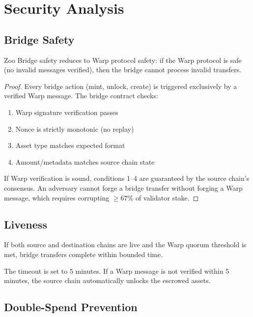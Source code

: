\section{Security Analysis}

\label{sec:security}

\subsection{Bridge Safety}

\begin{theorem}
Zoo Bridge safety reduces to Warp protocol safety: if the Warp protocol is safe (no invalid messages verified), then the bridge cannot process invalid transfers.
\end{theorem}

\begin{proof}
Every bridge action (mint, unlock, create) is triggered exclusively by a verified Warp message. The bridge contract checks:
\begin{enumerate}
    \item Warp signature verification passes
    \item Nonce is strictly monotonic (no replay)
    \item Asset type matches expected format
    \item Amount/metadata matches source chain state
\end{enumerate}
If Warp verification is sound, conditions 1--4 are guaranteed by the source chain's consensus. An adversary cannot forge a bridge transfer without forging a Warp message, which requires corrupting $\geq 67\%$ of validator stake.
\end{proof}

\subsection{Liveness}

\begin{theorem}
If both source and destination chains are live and the Warp quorum threshold is met, bridge transfers complete within bounded time.
\end{theorem}

The timeout is set to 5 minutes. If a Warp message is not verified within 5 minutes, the source chain automatically unlocks the escrowed assets.

\subsection{Double-Spend Prevention}

